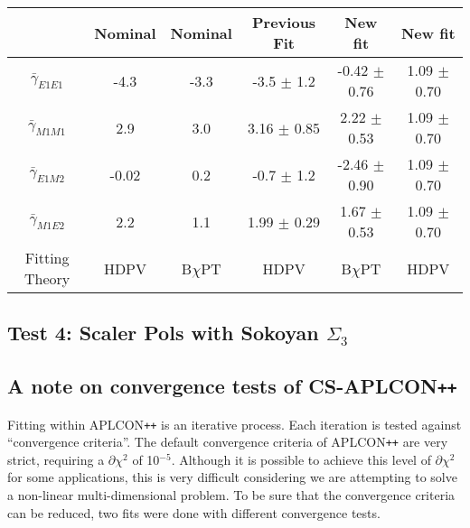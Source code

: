 \documentclass[]{article}
\begin{document}
\begin{table}[h!]
	\centering %
	\begin{tabular}{|c|cc|c|c|c|} %
		\hline
		                    & Nominal & Nominal & Previous Fit & New fit & New fit\\
		\hline %
		$\bar{\gamma}_{E1E1}$ & -4.3 & -3.3 & -3.5 $\pm$ 1.2 & -0.42 $\pm$ 0.76 & 1.09 $\pm$ 0.70 \\ 
		$\bar{\gamma}_{M1M1}$ & 2.9 & 3.0 & 3.16 $\pm$ 0.85 & 2.22 $\pm$ 0.53 & 1.09 $\pm$ 0.70\\
		$\bar{\gamma}_{E1M2}$ & -0.02 & 0.2 & -0.7 $\pm$ 1.2 & -2.46 $\pm$ 0.90 & 1.09 $\pm$ 0.70\\
		$\bar{\gamma}_{M1E2}$ & 2.2 & 1.1 & 1.99 $\pm$ 0.29 & 1.67 $\pm$ 0.53 & 1.09 $\pm$ 0.70\\[0.5ex]
		\hline
		Fitting Theory & HDPV & B$\chi$PT & HDPV & B$\chi$PT& HDPV\\
		\hline
	\end{tabular}
\end{table}




\subsection{Test 4: Scaler Pols with Sokoyan $\Sigma_{3}$}\label{Section:AlphaBetaTest}
	





















\newpage 
\subsection{A note on convergence tests of CS-APLCON\texttt{++}}

Fitting within APLCON\texttt{++} is an iterative process. Each iteration is tested against \enquote{convergence criteria}. The default convergence criteria of APLCON\texttt{++} are very strict, requiring a $\partial\chi^{2}$ of 10$^{-5}$. Although it is possible to achieve this level of $\partial\chi^{2}$ for some applications, this is very difficult considering we are attempting to solve a non-linear multi-dimensional problem. To be sure that the convergence criteria can be reduced, two fits were done with different convergence tests. \\
\end{document}
